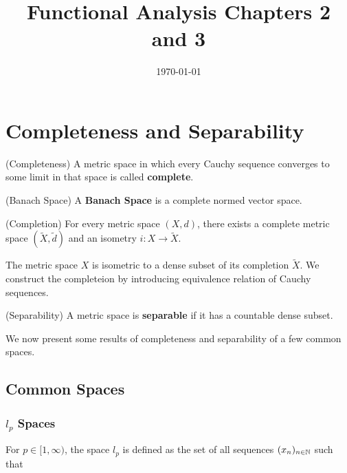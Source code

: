 \documentclass{article}
\title{Functional Analysis Chapters 2 and 3}
\date{\today}
\begin{document}
\maketitle

% 

\section{Completeness and Separability}  

\begin{defn}
    (Completeness)
    A metric space in which every Cauchy sequence converges to some limit in that space is called 
    \textbf{complete}.  
\end{defn}  

\begin{defn}
    (Banach Space) 
    A \textbf{Banach Space} is a complete normed vector space.
\end{defn}

\begin{thm}
    (Completion)  
    For every metric space $(X, d)$, there exists a complete metric space $(\tilde{X}, \tilde{d})$ 
    and an isometry $i: X \to \tilde{X}$.   
\end{thm}  

\begin{remark}
    The metric space $X$ is isometric to a dense subset of its completion $\tilde{X}$.  
    We construct the completeion by introducing equivalence relation of Cauchy sequences.
\end{remark}

\begin{defn}
    (Separability) 
    A metric space is \textbf{separable} if it has a countable dense subset.  
\end{defn}  

We now present some results of completeness and separability of a few common spaces.    

\subsection{Common Spaces}  

\subsubsection*{$l_p$ Spaces}    
For $p \in [1,\infty)$, the space $l_p$ is defined as the set of all sequences $(x_n)_{n\in \mathbb{N}}$ such that  
\end{document}
